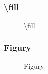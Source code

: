 \documentclass[10pt,t]{beamer}
\begin{document}
\begin{frame}
  \frametitle{\textbackslash fill}


  \begin{figure}

    \centering

    \begin{tikzpicture}


    \end{tikzpicture}

    \caption{\textbackslash fill}

  \end{figure}

\end{frame}





\begin{frame}
  \frametitle{Figury}


  \begin{figure}

    \centering

    \begin{tikzpicture}







    \end{tikzpicture}

    \caption{Figury}

  \end{figure}

\end{frame}
\end{document}
